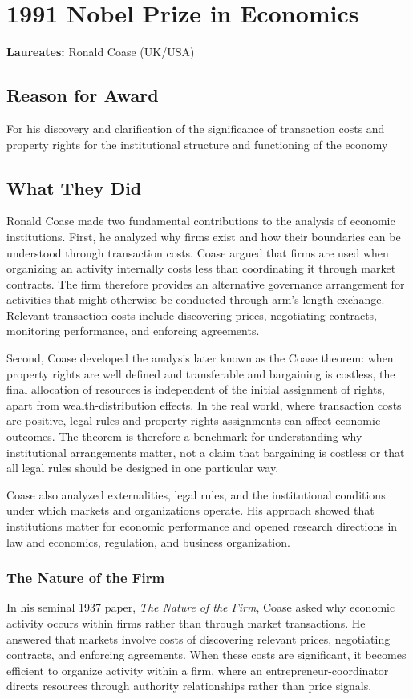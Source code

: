 \chapter{1991 Nobel Prize in Economics}
\textbf{Laureates: }Ronald Coase (UK/USA)

\section*{Reason for Award}
For his discovery and clarification of the significance of transaction costs
and property rights for the institutional structure and functioning of the economy

\section{What They Did}
Ronald Coase made two fundamental contributions to the analysis of economic
institutions. First, he analyzed why firms exist and how their boundaries can
be understood through transaction costs. Coase argued that firms are used when
organizing an activity internally costs less than coordinating it through market
contracts. The firm therefore provides an alternative governance arrangement
for activities that might otherwise be conducted through arm's-length exchange.
Relevant transaction costs include discovering prices, negotiating contracts,
monitoring performance, and enforcing agreements.

Second, Coase developed the analysis later known as the Coase theorem: when
property rights are well defined and transferable and bargaining is costless,
the final allocation of resources is independent of the initial assignment of
rights, apart from wealth-distribution effects. In the real world, where
transaction costs are positive, legal rules and property-rights assignments can
affect economic outcomes. The theorem is therefore a benchmark for understanding
why institutional arrangements matter, not a claim that bargaining is costless
or that all legal rules should be designed in one particular way.

Coase also analyzed externalities, legal rules, and the institutional conditions
under which markets and organizations operate. His approach showed that
institutions matter for economic performance and opened research directions in
law and economics, regulation, and business organization.

\subsection*{The Nature of the Firm}
In his seminal 1937 paper, \textit{The Nature of the Firm}, Coase asked why economic
activity occurs within firms rather than through market transactions. He
answered that markets involve costs of discovering relevant prices, negotiating
contracts, and enforcing agreements. When these costs are significant, it becomes
efficient to organize activity within a firm, where an entrepreneur-coordinator
directs resources through authority relationships rather than price signals.

